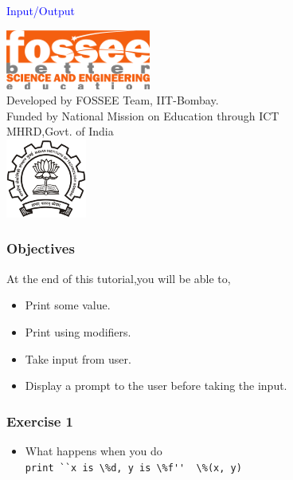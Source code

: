 \documentclass[presentation]{beamer}
\title{}
\author{FOSSEE}
\date{}
\begin{document}
\begin{frame}

\begin{center}
\vspace{12pt}
\textcolor{blue}{\huge Input/Output}
\end{center}
\vspace{18pt}
\begin{center}
\vspace{10pt}
\includegraphics[scale=0.95]{../images/fossee-logo.png}\\
\vspace{5pt}
\scriptsize Developed by FOSSEE Team, IIT-Bombay. \\ 
\scriptsize Funded by National Mission on Education through ICT\\
\scriptsize  MHRD,Govt. of India\\
\includegraphics[scale=0.30]{../images/iitb-logo.png}\\
\end{center}
\end{frame}
\begin{frame}
\frametitle{Objectives}
\label{sec-2}

At the end of this tutorial,you will be able to, 


\begin{itemize}
\item Print some value.
\item Print using modifiers.
\item Take input from user.
\item Display a prompt to the user before taking the input.
\end{itemize}
   
\end{frame}
\begin{frame}
\frametitle{Exercise 1}
\label{sec-3}


\begin{itemize}
\item What happens when you do\\
  \verb~print ``x is \%d, y is \%f''  \%(x, y)~
\end{itemize}
\end{frame}
\end{document}

